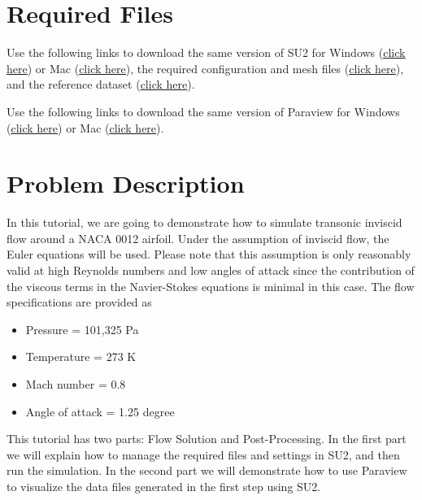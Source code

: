 \section*{Required Files}
\begin{su2note}
	Use the following links to download the same version of SU2 for Windows (\href{https://users.encs.concordia.ca/~bvermeir/book/executables/windows/SU2_Windows.zip}{\underline{click here}}) or Mac (\href{https://users.encs.concordia.ca/~bvermeir/book/executables/osx/SU2_Mac.zip}{\underline{click here}}), the required configuration and mesh files (\href{https://gitlab.com/bvermeir/book-cfd/blob/master/tutorial/tut1_inviscid_naca0012/naca0012.zip}{\underline{click here}}), and the reference dataset (\href{https://gitlab.com/bvermeir/book-cfd/blob/master/tutorial/tut1_inviscid_naca0012/experimental_values.zip}{\underline{click here}}).
\end{su2note}
\begin{paraviewnote}
	Use the following links to download the same version of Paraview for Windows (\href{https://users.encs.concordia.ca/~bvermeir/book/executables/windows/ParaView-5.4.0-Qt5-OpenGL2-Windows-64bit.exe}{\underline{click here}}) or Mac (\href{https://users.encs.concordia.ca/~bvermeir/book/executables/osx/ParaView-5.4.0-Qt5-OpenGL2-MPI-OSX10.8-64bit.dmg}{\underline{click here}}).
\end{paraviewnote}

\section*{Problem Description}
In this tutorial, we are going to demonstrate how to simulate transonic inviscid flow around a NACA 0012 airfoil. Under the assumption of inviscid flow, the Euler equations will be used. Please note that this assumption is only reasonably valid at high Reynolds numbers and low angles of attack since the contribution of the viscous terms in the Navier-Stokes equations is minimal in this case. The flow specifications are provided as
\begin{itemize}
    \item Pressure = 101,325 Pa
    \item Temperature = 273 K
    \item Mach number = 0.8
    \item Angle of attack = 1.25 degree
\end{itemize}
This tutorial has two parts: Flow Solution and Post-Processing. In the first part we will explain how to manage the required files and settings in SU2, and then run the simulation. In the second part we will demonstrate how to use Paraview to visualize the data files generated in the first step using SU2.
